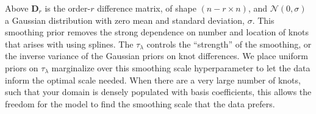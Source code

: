 \noindent Above $\bm{D}_r$ is the order-$r$ difference matrix, of shape $(n-r \times n)$, and $\mathcal{N}(0,\sigma)$ a Gaussian distribution with zero mean 
and standard deviation, $\sigma$. This smoothing prior removes the strong dependence on number and location of knots that arises with using splines. 
The $\tau_\lambda$ controls the ``strength'' of the smoothing, or the inverse variance of the Gaussian priors on knot differences. We 
place uniform priors on $\tau_\lambda$ marginalize over this smoothing scale hyperparameter to let the data inform the optimal scale needed.
When there are a very large number of knots, such that your domain is densely populated with basis coefficients, this allows the freedom for the model to find the smoothing 
scale that the data prefers. 






